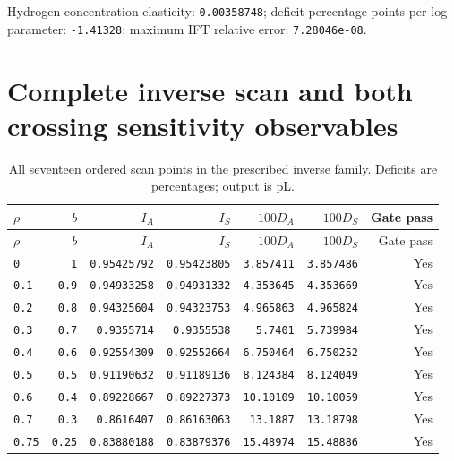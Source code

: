 Hydrogen concentration elasticity: \texttt{0.00358748}; deficit percentage points per log parameter: \texttt{-1.41328}; maximum IFT relative error: \texttt{7.28046e-08}.\par




\section{Complete inverse scan and both crossing sensitivity observables}

\begingroup\scriptsize
\setlength{\tabcolsep}{3pt}
\begin{longtable}{lrrrrrr}
\caption{All seventeen ordered scan points in the prescribed inverse family. Deficits are percentages; output is pL.}\\
\toprule
$\rho$ & $b$ & $I_A$ & $I_S$ & $100D_A$ & $100D_S$ & Gate pass \\
\midrule\endfirsthead
\toprule
$\rho$ & $b$ & $I_A$ & $I_S$ & $100D_A$ & $100D_S$ & Gate pass \\
\midrule\endhead
\bottomrule\endfoot
\texttt{0} & \texttt{1} & \texttt{0.95425792} & \texttt{0.95423805} & \texttt{3.857411} & \texttt{3.857486} & Yes \\
\texttt{0.1} & \texttt{0.9} & \texttt{0.94933258} & \texttt{0.94931332} & \texttt{4.353645} & \texttt{4.353669} & Yes \\
\texttt{0.2} & \texttt{0.8} & \texttt{0.94325604} & \texttt{0.94323753} & \texttt{4.965863} & \texttt{4.965824} & Yes \\
\texttt{0.3} & \texttt{0.7} & \texttt{0.9355714} & \texttt{0.9355538} & \texttt{5.7401} & \texttt{5.739984} & Yes \\
\texttt{0.4} & \texttt{0.6} & \texttt{0.92554309} & \texttt{0.92552664} & \texttt{6.750464} & \texttt{6.750252} & Yes \\
\texttt{0.5} & \texttt{0.5} & \texttt{0.91190632} & \texttt{0.91189136} & \texttt{8.124384} & \texttt{8.124049} & Yes \\
\texttt{0.6} & \texttt{0.4} & \texttt{0.89228667} & \texttt{0.89227373} & \texttt{10.10109} & \texttt{10.10059} & Yes \\
\texttt{0.7} & \texttt{0.3} & \texttt{0.8616407} & \texttt{0.86163063} & \texttt{13.1887} & \texttt{13.18798} & Yes \\
\texttt{0.75} & \texttt{0.25} & \texttt{0.83880188} & \texttt{0.83879376} & \texttt{15.48974} & \texttt{15.48886} & Yes \\

\end{longtable}
